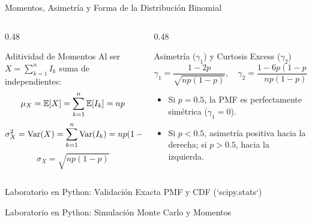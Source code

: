 \documentclass[10pt, aspectratio=169]{beamer}
\begin{document}
\begin{frame}{Momentos, Asimetría y Forma de la Distribución Binomial}
  \begin{columns}[T]
    \begin{column}{0.48\textwidth}
      \begin{block}{Aditividad de Momentos}
        \footnotesize
        Al ser $X = \sum_{k=1}^n I_k$ suma de independientes:
        $$\mu_X = \mathbb{E}[X] = \sum_{k=1}^n \mathbb{E}[I_k] = np$$
        $$\sigma_X^2 = \operatorname{Var}(X) = \sum_{k=1}^n \operatorname{Var}(I_k) = np(1-p)$$
        $$\sigma_X = \sqrt{np(1-p)}$$
      \end{block}
    \end{column}
    \begin{column}{0.48\textwidth}
      \pause
      \begin{alertblock}{Asimetría ($\gamma_1$) y Curtosis Excess ($\gamma_2$)}
        \footnotesize
        $$\gamma_1 = \dfrac{1 - 2p}{\sqrt{np(1-p)}}, \quad \gamma_2 = \dfrac{1 - 6p(1-p)}{np(1-p)}$$
        \begin{itemize}\itemsep=0.06cm
          \item Si $p = 0.5$, la PMF es perfectamente simétrica ($\gamma_1 = 0$).
          \item Si $p < 0.5$, asimetría positiva hacia la derecha; si $p > 0.5$, hacia la izquierda.
        \end{itemize}
      \end{alertblock}
    \end{column}
  \end{columns}
\end{frame}

\begin{frame}[fragile]{Laboratorio en Python: Validación Exacta PMF y CDF (`scipy.stats`)}
  
\end{frame}

\begin{frame}[fragile]{Laboratorio en Python: Simulación Monte Carlo y Momentos}
  
\end{frame}
\end{document}

